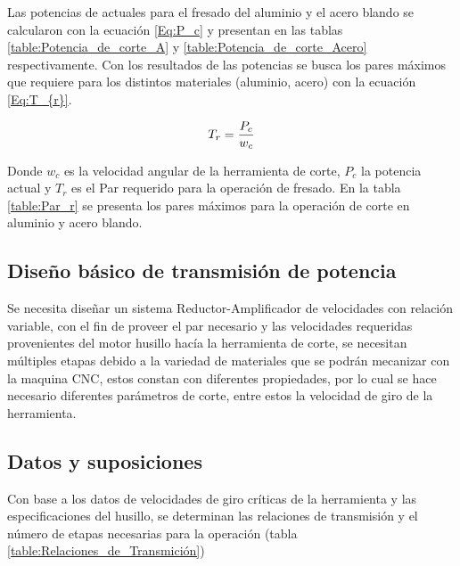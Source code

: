 Las potencias de actuales para el fresado del aluminio y el acero blando se calcularon con la ecuación \ref{Eq:P_c} y presentan en las tablas \ref{table:Potencia_de_corte_A} y \ref{table:Potencia_de_corte_Acero} respectivamente. Con los resultados de las potencias se busca los pares máximos que requiere para los distintos materiales (aluminio, acero) con la ecuación \ref{Eq:T_{r}}. 

 \newpage


\begin{equation}
    T_{r}=\frac{P_{c}}{w_{c}}
    \label{Eq:T_{r}}
\end{equation}

Donde $w_{c}$ es la velocidad angular de la herramienta de corte, $P_{c}$ la potencia actual y $T_{r}$ es el Par requerido para la operación de fresado. En la tabla \ref{table:Par_r} se presenta los pares máximos para la operación de corte en aluminio y acero blando.

\newpage
\subsection{Diseño básico de transmisión de potencia}

Se necesita diseñar un sistema Reductor-Amplificador de velocidades con relación variable, con el fin de proveer el par necesario y las velocidades requeridas provenientes del motor husillo hacía la herramienta de corte, se necesitan múltiples etapas debido a la variedad de materiales que se podrán mecanizar con la maquina CNC, estos constan con diferentes propiedades, por lo cual se hace necesario diferentes parámetros de corte, entre estos la velocidad de giro de la herramienta.
\subsection*{Datos y suposiciones}
Con base a los datos de velocidades de giro críticas de la herramienta y las especificaciones del husillo, se determinan las relaciones de transmisión y el número de etapas necesarias para la operación (tabla \ref{table:Relaciones_de_Transmición})

